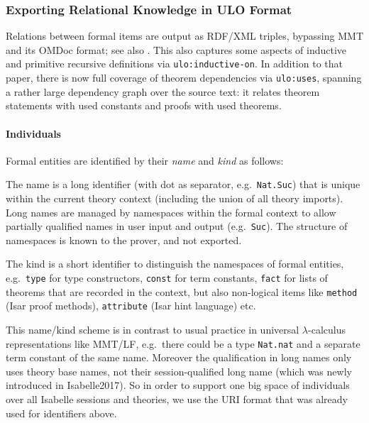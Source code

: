 \subsubsection{Exporting Relational Knowledge in ULO Format}

Relations between formal items are output as RDF/XML triples,
  bypassing MMT and its OMDoc format; see also
  \cite[\S3.1]{ConKohMue:rdaml19}.  This also captures some aspects of
  inductive and primitive recursive definitions via
  \verb,ulo:inductive-on,. In addition to that paper, there is now
  full coverage of theorem dependencies via \verb,ulo:uses,, spanning
  a rather large dependency graph over the source text: it relates
  theorem statements with used constants and proofs with used
  theorems.  



\paragraph{Individuals}
Formal entities are identified by their \emph{name} and \emph{kind} as follows:
\begin{compactitem}
\item The name is a long identifier (with dot as separator, e.g.\ \texttt{Nat.Suc}) that is unique within the current theory context (including the union of all theory imports). Long names are managed by namespaces within the formal context to allow partially qualified names in user input and output (e.g.\ \texttt{Suc}). The structure of namespaces is known to the prover, and not exported.
\item The kind is a short identifier to distinguish the namespaces of formal entities, e.g.\ \texttt{type} for type constructors, \texttt{const} for term constants, \texttt{fact} for lists of theorems that are recorded in the context, but also non-logical items like \texttt{method} (Isar proof methods), \texttt{attribute} (Isar hint language) etc.
\end{compactitem}

\noindent
This name/kind scheme is in contrast to usual practice in universal $\lambda$-calculus representations like MMT/LF, e.g.\ there could be a type \texttt{Nat.nat} and a separate term constant of the same name.  Moreover the qualification in long names only uses theory base names, not their session-qualified long name (which was newly introduced in Isabelle2017). So in order to support one big space of individuals over all Isabelle sessions and theories, we use the URI format that was already used for identifiers above.

